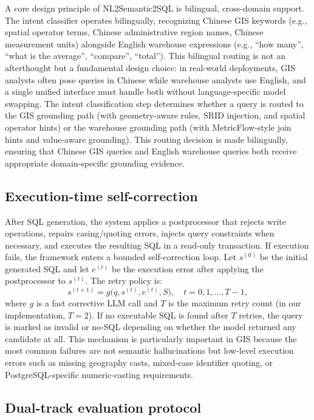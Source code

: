 \documentclass[11pt]{article}
\begin{document}
A core design principle of NL2Semantic2SQL is bilingual, cross-domain support. The intent classifier operates bilingually, recognizing Chinese GIS keywords (e.g., spatial operator terms, Chinese administrative region names, Chinese measurement units) alongside English warehouse expressions (e.g., ``how many'', ``what is the average'', ``compare'', ``total''). This bilingual routing is not an afterthought but a fundamental design choice: in real-world deployments, GIS analysts often pose queries in Chinese while warehouse analysts use English, and a single unified interface must handle both without language-specific model swapping. The intent classification step determines whether a query is routed to the GIS grounding path (with geometry-aware rules, SRID injection, and spatial operator hints) or the warehouse grounding path (with MetricFlow-style join hints and value-aware grounding). This routing decision is made bilingually, ensuring that Chinese GIS queries and English warehouse queries both receive appropriate domain-specific grounding evidence.

\subsection{Execution-time self-correction}

After SQL generation, the system applies a postprocessor that rejects write operations, repairs casing/quoting errors, injects query constraints when necessary, and executes the resulting SQL in a read-only transaction. If execution fails, the framework enters a bounded self-correction loop. Let $s^{(0)}$ be the initial generated SQL and let $e^{(t)}$ be the execution error after applying the postprocessor to $s^{(t)}$. The retry policy is:
\begin{equation}
  s^{(t+1)} = g\big(q, s^{(t)}, e^{(t)}, S\big), \quad t = 0,1,\dots,T-1,
\end{equation}
where $g$ is a fast corrective LLM call and $T$ is the maximum retry count (in our implementation, $T=2$). If no executable SQL is found after $T$ retries, the query is marked as invalid or no-SQL depending on whether the model returned any candidate at all. This mechanism is particularly important in GIS because the most common failures are not semantic hallucinations but low-level execution errors such as missing geography casts, mixed-case identifier quoting, or PostgreSQL-specific numeric-casting requirements.

\subsection{Dual-track evaluation protocol}
\end{document}
